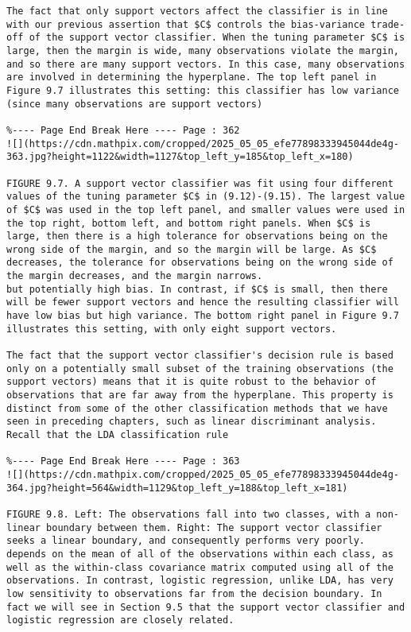 \documentclass[10pt]{article}
\begin{document}
\begin{verbatim}
The fact that only support vectors affect the classifier is in line with our previous assertion that $C$ controls the bias-variance trade-off of the support vector classifier. When the tuning parameter $C$ is large, then the margin is wide, many observations violate the margin, and so there are many support vectors. In this case, many observations are involved in determining the hyperplane. The top left panel in Figure 9.7 illustrates this setting: this classifier has low variance (since many observations are support vectors)

%---- Page End Break Here ---- Page : 362
![](https://cdn.mathpix.com/cropped/2025_05_05_efe77898333945044de4g-363.jpg?height=1122&width=1127&top_left_y=185&top_left_x=180)

FIGURE 9.7. A support vector classifier was fit using four different values of the tuning parameter $C$ in (9.12)-(9.15). The largest value of $C$ was used in the top left panel, and smaller values were used in the top right, bottom left, and bottom right panels. When $C$ is large, then there is a high tolerance for observations being on the wrong side of the margin, and so the margin will be large. As $C$ decreases, the tolerance for observations being on the wrong side of the margin decreases, and the margin narrows.
but potentially high bias. In contrast, if $C$ is small, then there will be fewer support vectors and hence the resulting classifier will have low bias but high variance. The bottom right panel in Figure 9.7 illustrates this setting, with only eight support vectors.

The fact that the support vector classifier's decision rule is based only on a potentially small subset of the training observations (the support vectors) means that it is quite robust to the behavior of observations that are far away from the hyperplane. This property is distinct from some of the other classification methods that we have seen in preceding chapters, such as linear discriminant analysis. Recall that the LDA classification rule

%---- Page End Break Here ---- Page : 363
![](https://cdn.mathpix.com/cropped/2025_05_05_efe77898333945044de4g-364.jpg?height=564&width=1129&top_left_y=188&top_left_x=181)

FIGURE 9.8. Left: The observations fall into two classes, with a non-linear boundary between them. Right: The support vector classifier seeks a linear boundary, and consequently performs very poorly.
depends on the mean of all of the observations within each class, as well as the within-class covariance matrix computed using all of the observations. In contrast, logistic regression, unlike LDA, has very low sensitivity to observations far from the decision boundary. In fact we will see in Section 9.5 that the support vector classifier and logistic regression are closely related.


\end{verbatim}
\end{document}
